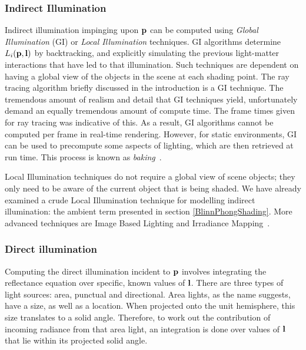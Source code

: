 \subsubsection{Indirect Illumination}

Indirect illumination impinging upon \begin{math}\mathbf{p}\end{math} can be computed using \textit{Global Illumination} (GI) or \textit{Local Illumination} techniques. GI algorithms determine \begin{math}L_i(\mathbf{p}, \mathbf{l})\end{math} by backtracking, and explicitly simulating the previous light-matter interactions that have led to that illumination. Such techniques are dependent on having a global view of the objects in the scene at each shading point. The ray tracing algorithm briefly discussed in the introduction is a GI technique. The tremendous amount of realism and detail that GI techniques yield, unfortunately demand an equally tremendous amount of compute time. The frame times given for ray tracing was indicative of this. As a result, GI algorithms cannot be computed per frame in real-time rendering. However, for static environments, GI can be used to precompute some aspects of lighting, which are then retrieved at run time. This process is known as \textit{baking}~\cite{UberBake}.

Local Illumination techniques do not require a global view of scene objects; they only need to be aware of the current object that is being shaded. We have already examined a crude Local Illumination technique for modelling indirect illumination: the ambient term presented in section \ref{BlinnPhongShading}. More advanced techniques are Image Based Lighting and Irradiance Mapping~\cite{HoffmanPBSBackground}\cite{IrradianceMaps}.

\subsubsection{Direct illumination}

Computing the direct illumination incident to \begin{math}\mathbf{p}\end{math} involves integrating the reflectance equation over specific, known values of \begin{math}\mathbf{l}\end{math}. There are three types of light sources: area, punctual and directional. Area lights, as the name suggests, have a size, as well as a location. When projected onto the unit hemisphere, this size translates to a solid angle. Therefore, to work out the contribution of incoming radiance from that area light, an integration is done over values of \begin{math}\mathbf{l}\end{math} that lie within its projected solid angle.

